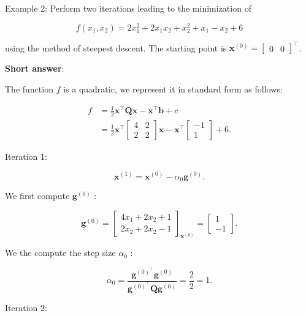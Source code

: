 Example 2: Perform two iterations leading to the minimization of

\[
	f\left(x_{1}, x_{2}\right)=2 x_{1}^{2}+2 x_{1} x_{2}+x_{2}^{2}+x_{1}-x_{2}+6
\]

using the method of steepest descent. The starting point is \(\boldsymbol{x}^{(0)}=\left[\begin{array}{ll}0 & 0\end{array}\right]^{\top}\). 

\textbf{Short answer}:

The function \(f\) is a quadratic, we represent it in standard form as follows:

\[
	\begin{array}{rlr}
		f & =\frac{1}{2} \boldsymbol{x}^{\top} \boldsymbol{Q} \boldsymbol{x}-\boldsymbol{x}^{\top} \boldsymbol{b}+c  \\
		& =\frac{1}{2} \boldsymbol{x}^{\top}\left[\begin{array}{ll}
			4 & 2 \\
			2 & 2
		\end{array}\right] \boldsymbol{x}-\boldsymbol{x}^{\top}\left[\begin{array}{c}
			-1 \\
			1
		\end{array}\right]+6 .
	\end{array}
\]

Iteration 1:

\[
	\boldsymbol{x}^{(1)}=\boldsymbol{x}^{(0)}-\alpha_{0} \boldsymbol{g}^{(0)}.
\]

We first compute \(\boldsymbol{g}^{(0)}\) :

\begin{equation*}
	\boldsymbol{g}^{(0)}=\left[\begin{array}{l}
		4 x_{1}+2 x_{2}+1 \\
		2 x_{2}+2 x_{2}-1
	\end{array}\right]_{\boldsymbol{x}^{(0)}}=\left[\begin{array}{c}
		1 \\
		-1
	\end{array}\right] .
\end{equation*}

We the compute the step size \(\alpha_{0}\) :

\[
	\alpha_{0}=\frac{\boldsymbol{g}^{(0)^{\top}} \boldsymbol{g}^{(0)}}{\boldsymbol{g}^{(0)^{\top}} \boldsymbol{Q} \boldsymbol{g}^{(0)}}=\frac{2}{2}=1 .
\]


Iteration 2:


